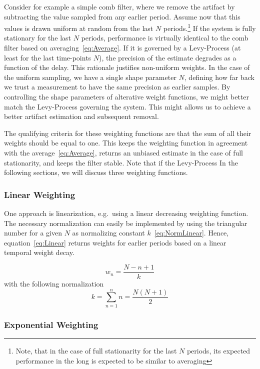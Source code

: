 \documentclass[a4paper]{article}
\begin{document}
Consider for example a simple comb filter, where we remove the artifact by subtracting the value sampled from any earlier period. Assume now that this values is drawn uniform at random from the last $N$ periods.\footnote{Note, that in the case of full stationarity for the last $N$ periods, its expected performance in the long is expected to be similar to averaging}
If the system is fully stationary for the last $N$ periods, performance is virtually identical to the comb filter based on averaging~\eqref{eq:Average}. If it is governed by a Levy-Process (at least for the last time-points $N$), the precision of the estimate degrades as a function of the delay. This rationale justifies non-uniform weights.
In the case of the uniform sampling, we have a single shape parameter $N$, defining how far back we trust a measurement to have the same precision as earlier samples. By controlling the shape parameters of alterative weight functions, we might better match the Levy-Process governing the system. This might allows us to achieve a better artifact estimation and subsequent removal.

The qualifying criteria for these weighting functions are that the sum of all their weights should be equal to one. This keeps the weighting function in agreement with the average~\eqref{eq:Average}, returns an unbiased estimate in the case of full stationarity, and keeps the filter stable. Note that if the Levy-Process  In the following sections, we will discuss three weighting functions.

\subsubsection{Linear Weighting}

One approach is linearization, e.g.\ using a linear decreasing weighting function.  The necessary normalization can easily be implemented by using the triangular number for a given $N$ as normalizing constant $k$~\eqref{eq:NormLinear}. Hence, equation~\eqref{eq:Linear} returns weights for earlier periods based on a linear temporal weight decay.

\begin{equation}
    w_n = \frac{N-n+1}{k}\label{eq:Linear}
\end{equation}
with the following normalization
\begin{equation}
    k  = \sum_{n=1}^{n} n = \frac{N(N+1)}{2}\label{eq:NormLinear}
\end{equation}

\subsubsection{Exponential Weighting}
\end{document}
